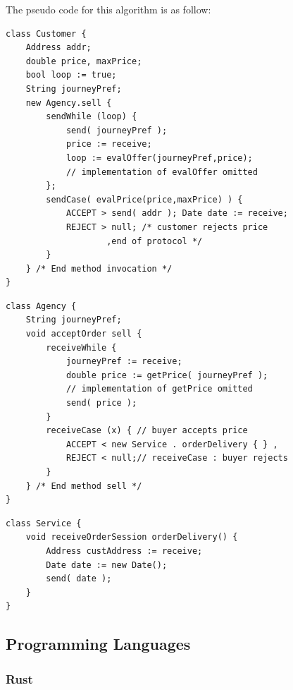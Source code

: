 \documentclass[runningheads]{llncs}
\begin{document}
The pseudo code for this algorithm is as follow:
\begin{lstlisting}[caption={Customer Algorithm},captionpos=b]
class Customer {
	Address addr;
	double price, maxPrice;
	bool loop := true;
	String journeyPref;
	new Agency.sell {
		sendWhile (loop) {
			send( journeyPref );
			price := receive;
			loop := evalOffer(journeyPref,price);
			// implementation of evalOffer omitted
		};
		sendCase( evalPrice(price,maxPrice) ) {
			ACCEPT > send( addr ); Date date := receive;
			REJECT > null; /* customer rejects price
					,end of protocol */ 
		}
	} /* End method invocation */
}
\end{lstlisting}
\begin{lstlisting}[caption={Agency Algorithm},captionpos=b]
class Agency {
	String journeyPref;
	void acceptOrder sell {
		receiveWhile {
			journeyPref := receive;
			double price := getPrice( journeyPref );
			// implementation of getPrice omitted
			send( price );
		}
		receiveCase (x) { // buyer accepts price
			ACCEPT < new Service . orderDelivery { } ,
			REJECT < null;// receiveCase : buyer rejects 
        }
	} /* End method sell */
}
\end{lstlisting}
\begin{lstlisting}[caption={Service Algorithm},captionpos=b]
class Service {
	void receiveOrderSession orderDelivery() {
		Address custAddress := receive;
		Date date := new Date();
		send( date );
	}
}
\end{lstlisting}
\subsection{Programming Languages}
\subsubsection{Rust}\hfill\\\\
\end{document}
